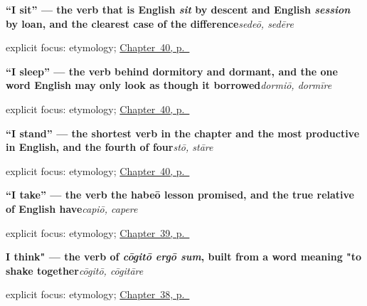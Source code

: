 \noindent\begin{minipage}[t]{\linewidth}
\raggedright
\textbf{\textquotedblleft{}I sit\textquotedblright{} — the verb that is English \emph{sit} by descent and English \emph{session} by loan, and the clearest case of the difference}\enspace\emph{sedeō, sedēre}\par
\footnotesize explicit focus: etymology; \hyperref[ch:la-sense-and-posture-verbs]{Chapter~40, p.~\pageref*{ch:la-sense-and-posture-verbs}}
\end{minipage}\par\smallskip

\noindent\begin{minipage}[t]{\linewidth}
\raggedright
\textbf{\textquotedblleft{}I sleep\textquotedblright{} — the verb behind dormitory and dormant, and the one word English may only look as though it borrowed}\enspace\emph{dormiō, dormīre}\par
\footnotesize explicit focus: etymology; \hyperref[ch:la-sense-and-posture-verbs]{Chapter~40, p.~\pageref*{ch:la-sense-and-posture-verbs}}
\end{minipage}\par\smallskip

\noindent\begin{minipage}[t]{\linewidth}
\raggedright
\textbf{\textquotedblleft{}I stand\textquotedblright{} — the shortest verb in the chapter and the most productive in English, and the fourth of four}\enspace\emph{stō, stāre}\par
\footnotesize explicit focus: etymology; \hyperref[ch:la-sense-and-posture-verbs]{Chapter~40, p.~\pageref*{ch:la-sense-and-posture-verbs}}
\end{minipage}\par\smallskip

\noindent\begin{minipage}[t]{\linewidth}
\raggedright
\textbf{\textquotedblleft{}I take\textquotedblright{} — the verb the habeō lesson promised, and the true relative of English have}\enspace\emph{capiō, capere}\par
\footnotesize explicit focus: etymology; \hyperref[ch:la-doing-verbs]{Chapter~39, p.~\pageref*{ch:la-doing-verbs}}
\end{minipage}\par\smallskip

\noindent\begin{minipage}[t]{\linewidth}
\raggedright
\textbf{I think" — the verb of \emph{cōgitō ergō sum}, built from a word meaning "to shake together}\enspace\emph{cōgitō, cōgitāre}\par
\footnotesize explicit focus: etymology; \hyperref[ch:la-mind-verbs]{Chapter~38, p.~\pageref*{ch:la-mind-verbs}}
\end{minipage}\par\smallskip

